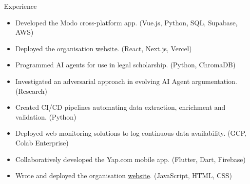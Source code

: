\documentclass{main}
\begin{document}
\begin{experienceSection}{Experience}

    \experienceItem[
        company={The Modo Collective},
        location={Singapore},
        position={Founder \& Lead Developer},
        duration={Jan. 2025 - Aug. 2025}
    ]
    \begin{itemize}
        \itemsep -6pt {}
        \item Developed the Modo cross-platform app. (Vue.js, Python, SQL, Supabase, AWS)
        \item Deployed the organisation \href{https://modo-com.vercel.app/}{website}. (React, Next.js, Vercel)
    \end{itemize}

    \experienceItem[
        company={SMU Yong Pung How School of Law},
        location={Singapore},
        position={Research Assistant},
        duration={Jan. 2025 - Apr. 2025}
    ]
    \begin{itemize}
        \itemsep -6pt {}
        \item Programmed AI agents for use in legal scholarship. (Python, ChromaDB)
        \item Investigated an adversarial approach in evolving AI Agent argumentation. (Research)
    \end{itemize}

    \experienceItem[
        company={Elefant},
        location={Singapore},
        position={Backend Development Intern},
        duration={Sep. 2024 - Dec. 2024}
    ]
    \begin{itemize}
        \itemsep -6pt {}
        \item Created CI/CD pipelines automating data extraction, enrichment and validation. (Python)
        \item Deployed web monitoring solutions to log continuous data availability. (GCP, Colab Enterprise)
    \end{itemize}

    \experienceItem[
        company={The Yap Labs},
        location={Singapore},
        position={Co-founder \& Tech Development Head},
        duration={Apr. 2024 - Aug. 2024}
    ]
    \begin{itemize}
        \itemsep -6pt {}
        \item Collaboratively developed the Yap.com mobile app. (Flutter, Dart, Firebase)
        \item Wrote and deployed the organisation \href{https://the-yap-labs.github.io/}{website}. (JavaScript, HTML, CSS)
    \end{itemize}

\end{experienceSection}
\end{document}
